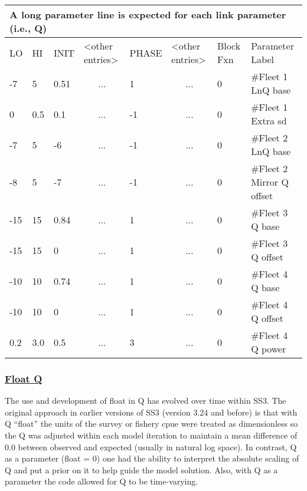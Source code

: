\begin{longtable}{p{1cm} p{1cm} p{1cm} p{1.5cm} p{1.5cm} p{1.5cm} p{1.75cm} p{4cm}}
	\multicolumn{8}{l}{A long parameter line is expected for each link parameter (i.e., Q)} \\
	\hline
	LO \Tstrut & HI & INIT & <other entries> & PHASE & <other entries> & Block Fxn & Parameter Label \Bstrut\\
	\hline
	-7  & 5   & 0.51 & \multicolumn{1}{c}{...} &  1 & \multicolumn{1}{c}{...} & 0 & \#Fleet 1 LnQ base \Tstrut\\
	 0  & 0.5 & 0.1  & \multicolumn{1}{c}{...} & -1 & \multicolumn{1}{c}{...} & 0 & \#Fleet 1 Extra \gls{sd} \\
	-7  & 5   & -6   & \multicolumn{1}{c}{...} & -1 & \multicolumn{1}{c}{...} & 0 & \#Fleet 2 LnQ base \\
	-8  & 5   & -7   & \multicolumn{1}{c}{...} & -1 & \multicolumn{1}{c}{...} & 0 & \#Fleet 2 Mirror Q offset \\
	-15 & 15  & 0.84 & \multicolumn{1}{c}{...} &  1 & \multicolumn{1}{c}{...} & 0 & \#Fleet 3 Q base \\
    -15 & 15  & 0    & \multicolumn{1}{c}{...} &  1 & \multicolumn{1}{c}{...} & 0 & \#Fleet 3 Q offset \\
	-10 & 10  & 0.74 & \multicolumn{1}{c}{...} &  1 & \multicolumn{1}{c}{...} & 0 & \#Fleet 4 Q base \\
    -10 & 10  & 0    & \multicolumn{1}{c}{...} &  1 & \multicolumn{1}{c}{...} & 0 & \#Fleet 4 Q offset \\
    0.2 & 3.0 & 0.5  & \multicolumn{1}{c}{...} &  3 & \multicolumn{1}{c}{...} & 0 & \#Fleet 4 Q power \Bstrut\\
	\hline
\end{longtable}

\hypertarget{FloatQ}{}
\subsubsection[Float Q]{\protect\hyperlink{FloatQ}{Float Q}}
The use and development of float in Q has evolved over time within SS3. The original approach in earlier versions of SS3 (version 3.24 and before) is that with Q ``float'' the units of the survey or fishery \gls{cpue} were treated as dimensionless so the Q was adjusted within each model iteration to maintain a mean difference of 0.0 between observed and expected (usually in natural log space). In contrast, Q as a parameter (float = 0) one had the ability to interpret the absolute scaling of Q and put a prior on it to help guide the model solution. Also, with Q as a parameter the code allowed for Q to be time-varying.

